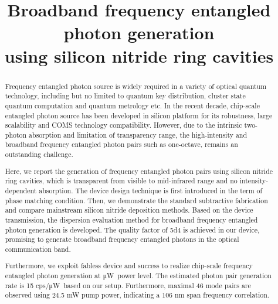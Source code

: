 \documentclass[final]{kuee_en}
\title{Broadband frequency entangled photon generation \\using silicon nitride ring cavities}
\author{\cjk{殷　政浩}}
\date{\cjk{令和2年1月31日}}
\newcommand{\uW}{\si{\micro\watt}~}
\begin{document}
\maketitle

\begin{abstract}
Frequency entangled photon source is widely required in a variety of optical quantum technology, including but no limited to quantum key distribution, cluster state quantum computation and quantum metrology etc. In the recent decade, chip-scale entangled photon source has been developed in silicon platform for its robustness, large scalability and COMS technology compatibility. However, due to the intrinsic two-photon absorption and limitation of transparency range, the high-intensity and broadband frequency entangled photon pairs such as one-octave, remains an outstanding challenge.

Here, we report the generation of frequency entangled photon pairs using silicon nitride ring cavities, which is transparent from visible to mid-infrared range and no intensity-dependent absorption.
The device design technique is first introduced in the term of phase matching condition. 
Then, we demonstrate the standard subtractive fabrication and compare mainstream silicon nitride deposition methods.
Based on the device transmission, the dispersion evaluation method for broadband frequency entangled photon generation is developed.
The quality factor of \num{5d4} is achieved in our device, promising to generate broadband frequency entangled photons in the optical communication band. 

Furthermore, we exploit fabless device and success to realize chip-scale frequency entangled photon generation at \uW power level. The estimated photon pair generation rate is 15 cps/\uW based on our setup. Furthermore, maximal 46 mode pairs are observed using 24.5 mW pump power, indicating a 106 nm span frequency correlation.


\end{abstract}

\tableofcontents









\end{document}
